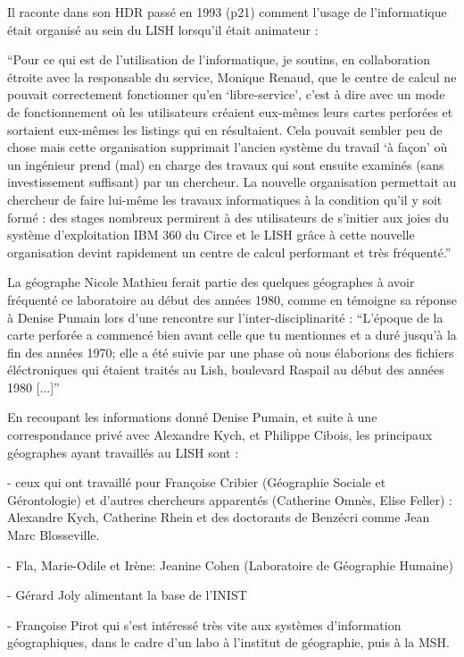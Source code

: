 Il raconte dans son HDR passé en 1993 (p21) comment l’usage de l’informatique était organisé au sein du LISH lorsqu’il était animateur  : 

\enquote{Pour ce qui est de l'utilisation de l'informatique, je soutins, en collaboration étroite avec la responsable du service, Monique Renaud, que le centre de calcul ne pouvait correctement fonctionner qu'en \enquote{libre-service}, c'est à dire avec un mode de fonctionnement où les utilisateurs créaient eux-mêmes leurs cartes perforées et sortaient eux-mêmes les listings qui en résultaient. Cela pouvait sembler peu de chose mais cette organisation supprimait l'ancien système du travail \enquote{à  façon} où un ingénieur  prend (mal) en charge des travaux  qui sont ensuite examinés (sans investissement suffisant) par un chercheur. La nouvelle organisation permettait au chercheur de faire lui-même les travaux informatiques à la condition qu'il y soit formé : des stages nombreux permirent à des utilisateurs de s'initier aux joies du système d'exploitation IBM 360 du Circe et le LISH grâce à cette nouvelle organisation devint rapidement un centre de calcul performant et très fréquenté.}

La géographe Nicole Mathieu ferait partie des quelques géographes à avoir fréquenté ce laboratoire au début des années 1980, comme en témoigne sa réponse à Denise Pumain lors d'une rencontre sur l'inter-disciplinarité : \enquote{L'époque de la carte perforée a commencé bien avant celle que tu mentionnes et a duré jusqu'à la fin des années 1970; elle a été suivie par une phase où nous élaborions des fichiers éléctroniques qui étaient traités au Lish, boulevard Raspail au début des années 1980 [...]} \autocite[154]{Mathieu2014}

En recoupant les informations donné Denise Pumain, et suite à une correspondance privé avec Alexandre Kych, et Philippe Cibois, les principaux géographes ayant travaillés au LISH sont : 

- ceux qui ont travaillé pour Françoise Cribier (Géographie Sociale et Gérontologie) et d'autres chercheurs apparentés (Catherine Omnès, Elise Feller) : Alexandre Kych, Catherine Rhein et des doctorants de Benzécri comme Jean Marc Blosseville.

- Fla, Marie-Odile et Irène: Jeanine Cohen (Laboratoire de Géographie Humaine)

- Gérard Joly alimentant la base de l'INIST

- Françoise Pirot qui s'est intéressé très vite aux systèmes d'information géographiques, dans le cadre d'un labo à l’institut de géographie, puis à la MSH.

